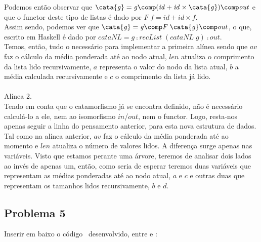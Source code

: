 \documentclass[a4paper]{article}
\newcommand{\Conid}[1]{\mathit{#1}}
\newcommand{\Varid}[1]{\mathit{#1}}
\begin{document}
Podemos então observar que $\ensuremath{\cata{\Varid{g}}\mathrel{=}\Varid{g}\comp (\Varid{id}\mathbin{+}\Varid{id}\times\cata{\Varid{g}})\comp \Varid{out}}$ e que o functor deste
tipo de listas é dado por $\ensuremath{\Conid{F}\;\Varid{f}\mathrel{=}\Varid{id}\mathbin{+}\Varid{id}\times\Varid{f}}$.\\
Assim sendo, podemos ver que $\ensuremath{\cata{\Varid{g}}\mathrel{=}\Varid{g}\comp \Conid{F}\;\cata{\Varid{g}}\comp \Varid{out}}$, o que, escrito em Haskell é dado
por $\ensuremath{\Varid{cataNL}\mathrel{=}\Varid{g}\comp \Varid{recList}\;(\Varid{cataNL}\;\Varid{g})\comp \Varid{out}}$.\\
Temos, então, tudo o necessário para implementar a primeira alínea sendo que $av$ faz o cálculo da média ponderada
até ao nodo atual, $len$ atualiza o comprimento da lista lido recursivamente, $a$ representa o valor
do nodo da lista atual, $b$ a média calculada recursivamente e $c$ o comprimento da lista já lido.
\\ \\
Alínea 2.
\\
Tendo em conta que o catamorfismo já se encontra definido, não é necessário calculá-lo a ele, nem ao isomorfismo 
$in$/$out$, nem o functor. Logo, resta-nos apenas seguir a linha do pensamento anterior, para esta nova estrutura de dados.\\
Tal como na alínea anterior, $av$ faz o cálculo da média ponderada até ao momento e $len$ atualiza o número de valores lidos.
A diferença surge apenas nas variáveis. Visto que estamos perante uma árvore, teremos de analisar dois lados ao invés de apenas um,
então, como seria de esperar teremos duas variáveis que representam as médias ponderadas até ao nodo atual, $a$ e $c$ e outras duas que
representam os tamanhos lidos recursivamente, $b$ e $d$.\\

\subsection*{Problema 5}
Inserir em baixo o código \Fsharp\ desenvolvido, entre  e :

\begin{tabbing}\ttfamily

\end{tabbing}



\printindex





\end{document}
